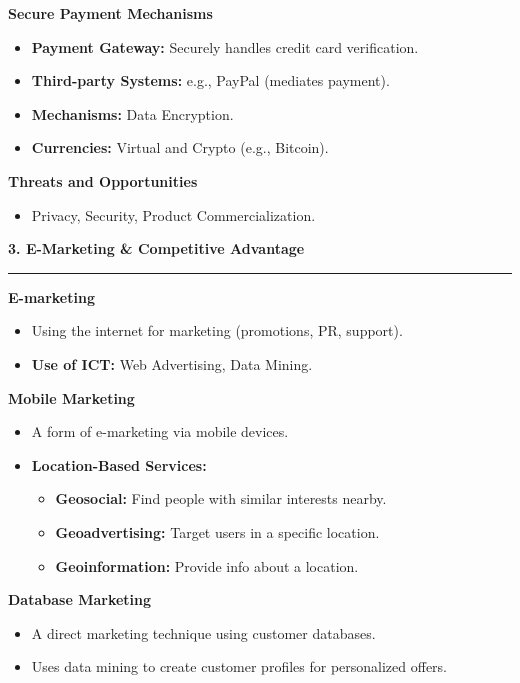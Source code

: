 \documentclass[a4paper, 8pt]{extarticle}
\newcommand{\sectionheading}[1]{\large\textbf{#1}\par\noindent\rule{\linewidth}{0.4pt}}
\newcommand{\subsectionheading}[1]{\normalsize\textbf{#1}}
\begin{document}
\begin{multicols}{2}
\subsectionheading{Secure Payment Mechanisms}
\begin{itemize}
    \item \textbf{Payment Gateway:} Securely handles credit card verification.
    \item \textbf{Third-party Systems:} e.g., PayPal (mediates payment).
    \item \textbf{Mechanisms:} Data Encryption.
    \item \textbf{Currencies:} Virtual and Crypto (e.g., Bitcoin).
\end{itemize}

\subsectionheading{Threats and Opportunities}
\begin{itemize}
    \item Privacy, Security, Product Commercialization.
\end{itemize}

\vspace{1em}
\sectionheading{3. E-Marketing \& Competitive Advantage}
\vspace{0.5em}
\subsectionheading{E-marketing}
\begin{itemize}
    \item Using the internet for marketing (promotions, PR, support).
    \item \textbf{Use of ICT:} Web Advertising, Data Mining.
\end{itemize}

\subsectionheading{Mobile Marketing}
\begin{itemize}
    \item A form of e-marketing via mobile devices.
    \item \textbf{Location-Based Services:}
    \begin{itemize}
        \item \textbf{Geosocial:} Find people with similar interests nearby.
        \item \textbf{Geoadvertising:} Target users in a specific location.
        \item \textbf{Geoinformation:} Provide info about a location.
    \end{itemize}
\end{itemize}

\subsectionheading{Database Marketing}
\begin{itemize}
    \item A direct marketing technique using customer databases.
    \item Uses data mining to create customer profiles for personalized offers.
\end{itemize}


\end{multicols}
\end{document}
